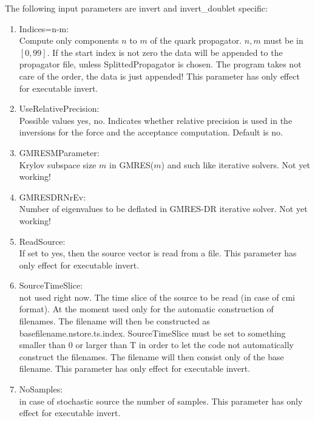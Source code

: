 The following input parameters are {\ttfamily invert} and {\ttfamily
  invert\_doublet} specific:
\begin{enumerate}
\item {\ttfamily Indices=n-m}:\\
  Compute only components $n$ to $m$ of the quark propagator. $n,m$ must
  be in $[0,99]$. If the start index is not zero the data will be
  appended to the propagator file, unless {\ttfamily
    SplittedPropagator} is chosen. The program takes not care of the
  order, the data is just appended! This parameter has only
  effect for executable {\ttfamily invert}.

\item {\ttfamily UseRelativePrecision}:\\
  Possible values {\ttfamily yes, no}. Indicates whether relative
  precision is used in the inversions for the force and the acceptance
  computation. Default is no.
  
\item {\ttfamily GMRESMParameter}:\\
  Krylov subspace size $m$ in GMRES($m$) and such like iterative
  solvers. Not yet working!

\item {\ttfamily GMRESDRNrEv}:\\
  Number of eigenvalues to be deflated in GMRES-DR iterative
  solver. Not yet working!

\item {\ttfamily ReadSource}:\\
  If set to yes, then the source vector is read from a file. This
  parameter has only effect for executable {\ttfamily invert}.

\item {\ttfamily SourceTimeSlice}:\\
  not used right now.
  The time slice of the source to be read (in case of cmi format). At
  the moment used only for
  the automatic construction of filenames. The filename will then be
  constructed as {\ttfamily basefilename.nstore.ts.index}.
  {\ttfamily SourceTimeSlice} must be set to something
  smaller than 0 or larger than T in order to let the code not
  automatically construct the filenames. The filename will then
  consist only of the base filename. This parameter has only
  effect for executable {\ttfamily invert}.

\item {\ttfamily NoSamples}:\\
  in case of stochastic source the number of samples. This parameter
  has only effect for executable {\ttfamily invert}.


\end{enumerate}

